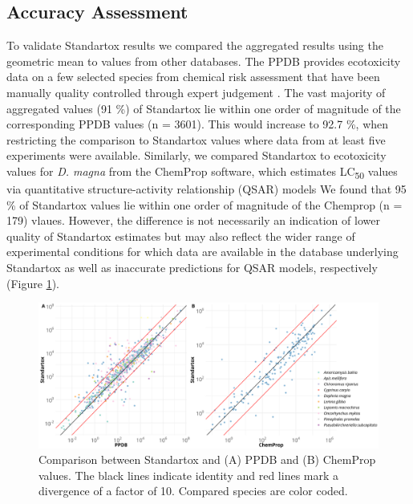 \subsection{Accuracy Assessment}
To validate Standartox results we compared the aggregated results using the geometric mean to values from other databases. The PPDB provides ecotoxicity data on a few selected species from chemical risk assessment that have been manually quality controlled through expert judgement \citep{lewis_international_2016}. The vast majority of aggregated values (91 \%) of Standartox lie within one order of magnitude of the corresponding PPDB values (n = 3601). This would increase to 92.7 \%, when restricting the comparison to Standartox values where data from at least five experiments were available. Similarly, we compared Standartox to ecotoxicity values for \textit{D. magna} from the ChemProp \citep{ufzdepartmentofecologicalchemistry_chemprop_2019} software, which estimates LC\textsubscript{50} values via quantitative structure-activity relationship (QSAR) models \citep{schuurmann_quantitative_2011} We found that  95 \% of Standartox values lie within one order of magnitude of the Chemprop (n = 179) vlaues. However, the diﬀerence is not necessarily an indication of lower quality of Standartox estimates but may also reflect the wider range of experimental conditions for which data are available in the database underlying Standartox as well as inaccurate predictions for QSAR models, respectively (Figure \ref{fig:standartox_ppdb_diff}).

\begin{figure}[h!]
    \includegraphics[width=1\linewidth]{article/figures/gg_ppdb_stan_compare_continous.png}
    \caption{Comparison between Standartox and (A) PPDB and (B) ChemProp values. The black lines indicate identity and red lines mark a divergence of a factor of 10. Compared species are color coded.}
    \label{fig:standartox_ppdb_diff}
\end{figure}

